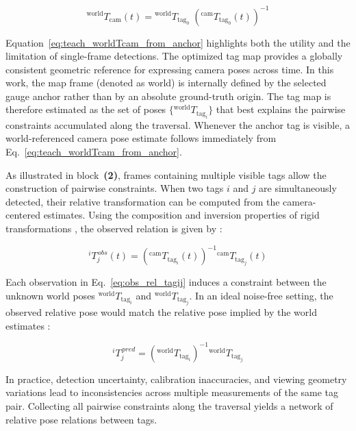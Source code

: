 \documentclass[a4paper,11pt]{article}
\begin{document}
\begin{equation}
	{}^{\text{world}}\!T_{\text{cam}}(t)
	=
	{}^{\text{world}}\!T_{\text{tag}_0}\;
	\left({}^{\text{cam}}\!T_{\text{tag}_0}(t)\right)^{-1}
	\label{eq:teach_worldTcam_from_anchor}
\end{equation}

Equation~\eqref{eq:teach_worldTcam_from_anchor} highlights both the utility and the limitation of single-frame detections. The optimized tag map provides a globally consistent geometric reference for expressing camera poses across time. In this work, the map frame (denoted as world) is internally defined by the selected gauge anchor rather than by an absolute ground-truth origin. The tag map is therefore estimated as the set of poses $\{{}^{\text{world}}\!T_{\text{tag}_i}\}$ that best explains the pairwise constraints accumulated along the traversal. Whenever the anchor tag is visible, a world-referenced camera pose estimate follows immediately from Eq.~\eqref{eq:teach_worldTcam_from_anchor}.

As illustrated in block~\textbf{(2)}, frames containing multiple visible tags allow the construction of pairwise constraints. When two tags $i$ and $j$ are simultaneously detected, their relative transformation can be computed from the camera-centered estimates. Using the composition and inversion properties of rigid transformations \cite{Hartley2004,barfoot2017state}, the observed relation is given by :

\begin{equation}
	{}^{i}\!T_{j}^{\,obs}(t)
	=
	\left({}^{\text{cam}}\!T_{\text{tag}_i}(t)\right)^{-1}
	{}^{\text{cam}}\!T_{\text{tag}_j}(t)
	\label{eq:obs_rel_tagij}
\end{equation}

Each observation in Eq.~\eqref{eq:obs_rel_tagij} induces a constraint between the unknown world poses ${}^{\text{world}}\!T_{\text{tag}_i}$ and ${}^{\text{world}}\!T_{\text{tag}_j}$. In an ideal noise-free setting, the observed relative pose would match the relative pose implied by the world estimates :

\begin{equation}
	{}^{i}\!T_{j}^{\,pred}
	=
	\left({}^{\text{world}}\!T_{\text{tag}_i}\right)^{-1}
	{}^{\text{world}}\!T_{\text{tag}_j}
	\label{eq:pred_rel_tagij}
\end{equation}

In practice, detection uncertainty, calibration inaccuracies, and viewing geometry variations lead to inconsistencies across multiple measurements of the same tag pair. Collecting all pairwise constraints along the traversal yields a network of relative pose relations between tags.
\end{document}
